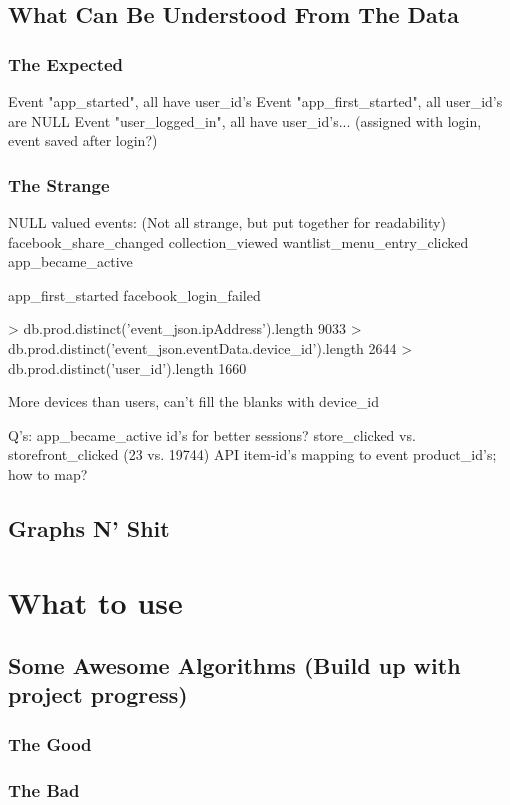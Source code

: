 \subsection{What Can Be Understood From The Data}
\subsubsection{The Expected}
Event "app\_started", all have user\_id's
Event "app\_first\_started", all user\_id's are NULL
Event "user\_logged\_in", all have user\_id's... (assigned with login, event saved after login?)

\subsubsection{The Strange}
NULL valued events: (Not all strange, but put together for readability)
facebook\_share\_changed
collection\_viewed
wantlist\_menu\_entry\_clicked
app\_became\_active

app\_first\_started
facebook\_login\_failed

> db.prod.distinct('event\_json.ipAddress').length
9033
> db.prod.distinct('event\_json.eventData.device\_id').length
2644
> db.prod.distinct('user\_id').length
1660

More devices than users, can't fill the blanks with device\_id

Q's:
    app\_became\_active id's for better sessions?
    store\_clicked vs. storefront\_clicked (23 vs. 19744)
    API item-id's mapping to event product\_id's; how to map?

\subsection{Graphs N' Shit}

\section{What to use}
\subsection{Some Awesome Algorithms (Build up with project progress)}
\subsubsection{The Good}
\subsubsection{The Bad}
